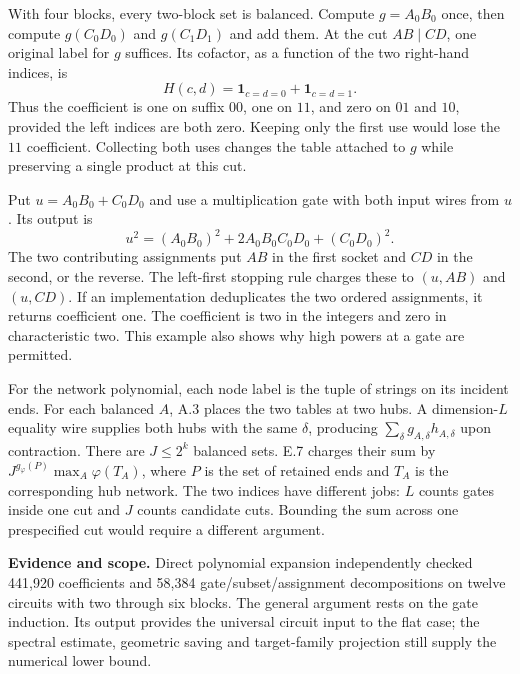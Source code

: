 
\clearpage
{}
With four blocks, every two-block set is balanced. Compute $g=A_0B_0$ once, then compute $g(C_0D_0)$ and $g(C_1D_1)$ and add them. At the cut $AB\mid CD$, one original label for $g$ suffices. Its cofactor, as a function of the two right-hand indices, is
\[
 H(c,d)=\mathbf{1}_{c=d=0}+\mathbf{1}_{c=d=1}.
\]
Thus the coefficient is one on suffix $00$, one on $11$, and zero on $01$ and $10$, provided the left indices are both zero. Keeping only the first use would lose the $11$ coefficient. Collecting both uses changes the table attached to $g$ while preserving a single product at this cut.

Put $u=A_0B_0+C_0D_0$ and use a multiplication gate with both input wires from $u$. Its output is
\[
 u^2=(A_0B_0)^2+2A_0B_0C_0D_0+(C_0D_0)^2 .
\]
The two contributing assignments put $AB$ in the first socket and $CD$ in the second, or the reverse. The left-first stopping rule charges these to $(u,AB)$ and $(u,CD)$. If an implementation deduplicates the two ordered assignments, it returns coefficient one. The coefficient is two in the integers and zero in characteristic two. This example also shows why high powers at a gate are permitted.

For the network polynomial, each node label is the tuple of strings on its incident ends. For each balanced $A$, A.3 places the two tables at two hubs. A dimension-$L$ equality wire supplies both hubs with the same $\delta$, producing $\sum_\delta g_{A,\delta}h_{A,\delta}$ upon contraction. There are $J\le2^k$ balanced sets. E.7 charges their sum by $J^{g_\varphi(P)}\max_A\varphi(T_A)$, where $P$ is the set of retained ends and $T_A$ is the corresponding hub network. The two indices have different jobs: $L$ counts gates inside one cut and $J$ counts candidate cuts. Bounding the sum across one prespecified cut would require a different argument.

\textbf{Evidence and scope.} Direct polynomial expansion independently checked 441,920 coefficients and 58,384 gate/subset/assignment decompositions on twelve circuits with two through six blocks. The general argument rests on the gate induction. Its output provides the universal circuit input to the flat case; the spectral estimate, geometric saving and target-family projection still supply the numerical lower bound.

